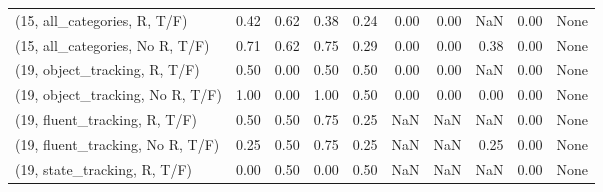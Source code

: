 \begin{table*}[h!]
\begin{adjustbox}{width=2\columnwidth,center}
\begin{tabular}{lrrr|rrr|rrr}
(15, all\_categories, R, T/F)          &                      0.42 &                  0.62 &                      0.38 &                          0.24 &                      0.00 &                          0.00 &                                    NaN &                               0.00 &                                  None \\
(15, all\_categories, No R, T/F)       &                      0.71 &                  0.62 &                      0.75 &                          0.29 &                      0.00 &                          0.00 &                                   0.38 &                               0.00 &                                  None \\



\midrule
(19, object\_tracking, R, T/F)         &                      0.50 &                  0.00 &                      0.50 &                          0.50 &                      0.00 &                          0.00 &                                    NaN &                               0.00 &                                  None \\
(19, object\_tracking, No R, T/F)      &                      1.00 &                  0.00 &                      1.00 &                          0.50 &                      0.00 &                          0.00 &                                   0.00 &                               0.00 &                                  None \\
(19, fluent\_tracking, R, T/F)         &                      0.50 &                  0.50 &                      0.75 &                          0.25 &                       NaN &                           NaN &                                    NaN &                               0.00 &                                  None \\
(19, fluent\_tracking, No R, T/F)      &                      0.25 &                  0.50 &                      0.75 &                          0.25 &                       NaN &                           NaN &                                   0.25 &                               0.00 &                                  None \\
(19, state\_tracking, R, T/F)          &                      0.00 &                  0.50 &                      0.00 &                          0.50 &                       NaN &                           NaN &                                    NaN &                               0.00 &                                  None \\

\end{tabular}
\end{adjustbox}
\end{table*}
